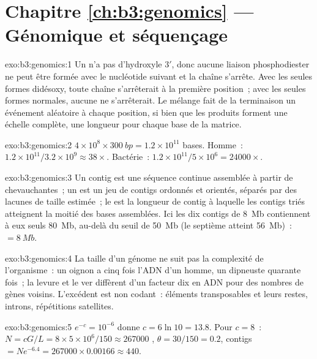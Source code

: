 \section*{Chapitre \ref{ch:b3:genomics} --- Génomique et séquençage}

\begin{solution}{exo:b3:genomics:1}
Un  n'a pas d'hydroxyle 3$'$, donc aucune liaison
phosphodiester ne peut être formée avec le nucléotide suivant et la
chaîne s'arrête. Avec les seules formes didésoxy, toute chaîne
s'arrêterait à la première position~; avec les seules formes normales,
aucune ne s'arrêterait. Le mélange fait de la terminaison un événement
aléatoire à chaque position, si bien que les produits forment une
échelle complète, une longueur pour chaque base de la matrice.
\end{solution}

\begin{solution}{exo:b3:genomics:2}
$4\times 10^{8}\times \qty{300}{bp} = 1.2\times 10^{11}$ bases.
Homme~: $1.2\times 10^{11}/3.2\times 10^{9} \approx 38\times$.
Bactérie~: $1.2\times 10^{11}/5\times 10^{6} = \num{24000}\times$.
\end{solution}

\begin{solution}{exo:b3:genomics:3}
Un contig est une séquence continue assemblée à partir de 
chevauchantes~; un  est un jeu de contigs ordonnés et
orientés, séparés par des lacunes de taille estimée~; le  est la
longueur de contig à laquelle les contigs triés atteignent la moitié
des bases assemblées. Ici les dix contigs de \qty{8}{Mb} contiennent à
eux seuls \qty{80}{Mb}, au-delà du seuil de \qty{50}{Mb} (le septième
atteint \qty{56}{Mb})~:  $= \qty{8}{Mb}$.
\end{solution}

\begin{solution}{exo:b3:genomics:4}
La taille d'un génome ne suit pas la complexité de l'organisme~: un
oignon a cinq fois l'ADN d'un homme, un dipneuste quarante fois~; la
levure et le ver diffèrent d'un facteur dix en ADN pour des nombres de
gènes voisins. L'excédent est non codant~: éléments transposables et
leurs restes, introns, répétitions satellites.
\end{solution}

\begin{solution}{exo:b3:genomics:5}
$e^{-c} = 10^{-6}$ donne $c = 6\ln 10 = 13.8$. Pour $c = 8$~: $N =
cG/L = 8\times 5\times 10^{6}/150 \approx \num{267000}$ , $\theta
= 30/150 = 0.2$, contigs $= N e^{-6.4} = \num{267000}\times 0.00166
\approx 440$.
\end{solution}

